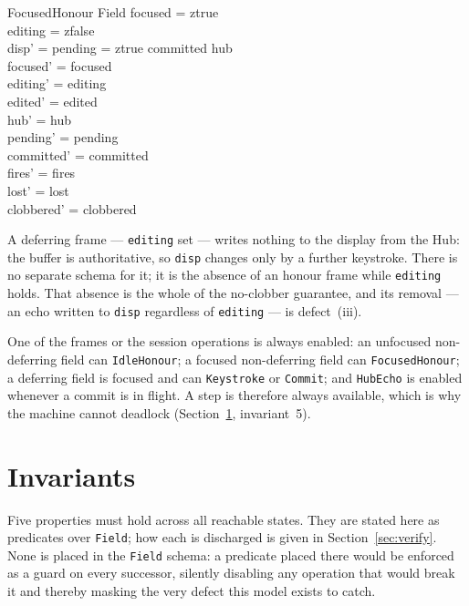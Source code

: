 \documentclass[a4paper,10pt,fleqn]{article}
\begin{document}
\begin{schema}{FocusedHonour}
  \Delta Field
\where
  focused = ztrue \\
  editing = zfalse \\
  disp' = \IF pending = ztrue \THEN committed \ELSE hub \\
  focused' = focused \\
  editing' = editing \\
  edited' = edited \\
  hub' = hub \\
  pending' = pending \\
  committed' = committed \\
  fires' = fires \\
  lost' = lost \\
  clobbered' = clobbered
\end{schema}

A deferring frame --- \texttt{editing} set --- writes nothing to the display from
the Hub: the buffer is authoritative, so \texttt{disp} changes only by a further
keystroke.  There is no separate schema for it; it is the absence of an honour
frame while \texttt{editing} holds.  That absence is the whole of the no-clobber
guarantee, and its removal --- an echo written to \texttt{disp} regardless of
\texttt{editing} --- is defect~(iii).

One of the frames or the session operations is always enabled: an unfocused
non-deferring field can \texttt{IdleHonour}; a focused non-deferring field can
\texttt{FocusedHonour}; a deferring field is focused and can \texttt{Keystroke}
or \texttt{Commit}; and \texttt{HubEcho} is enabled whenever a commit is in
flight.  A step is therefore always available, which is why the machine cannot
deadlock (Section~\ref{sec:inv}, invariant~5).

\section{Invariants}
\label{sec:inv}

Five properties must hold across all reachable states.  They are stated here as
predicates over \texttt{Field}; how each is discharged is given in
Section~\ref{sec:verify}.  None is placed in the \texttt{Field} schema: a
predicate placed there would be enforced as a guard on every successor, silently
disabling any operation that would break it and thereby masking the very defect
this model exists to catch.
\end{document}
